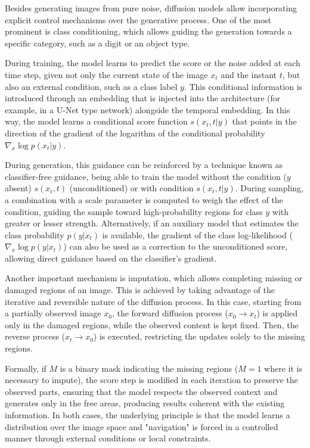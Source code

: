 \documentclass[11pt,a4paper]{article}
\begin{document}
Besides generating images from pure noise, diffusion models allow incorporating explicit control mechanisms over the generative process. One of the most prominent is class conditioning, which allows guiding the generation towards a specific category, such as a digit or an object type.

During training, the model learns to predict the score or the noise added at each time step, given not only the current state of the image $x_t$ and the instant $t$, but also an external condition, such as a class label $y$. This conditional information is introduced through an embedding that is injected into the architecture (for example, in a U-Net type network) alongside the temporal embedding. In this way, the model learns a conditional score function $s(x_t, t | y)$ that points in the direction of the gradient of the logarithm of the conditional probability $\nabla_{x} \log p(x_t | y)$.

During generation, this guidance can be reinforced by a technique known as classifier-free guidance, being able to train the model without the condition ($y$ absent) $s(x_t, t)$ (unconditioned) or with condition $s(x_t, t | y)$. During sampling, a combination with a scale parameter is computed to weigh the effect of the condition, guiding the sample toward high-probability regions for class $y$ with greater or lesser strength. Alternatively, if an auxiliary model that estimates the class probability $p(y | x_t)$ is available, the gradient of the class log-likelihood ($\nabla_{x} \log p(y | x_t)$) can also be used as a correction to the unconditioned score, allowing direct guidance based on the classifier's gradient.

Another important mechanism is imputation, which allows completing missing or damaged regions of an image. This is achieved by taking advantage of the iterative and reversible nature of the diffusion process. In this case, starting from a partially observed image $x_0$, the forward diffusion process ($x_0 \to x_t$) is applied only in the damaged regions, while the observed content is kept fixed. Then, the reverse process ($x_t \to x_0$) is executed, restricting the updates solely to the missing regions.

Formally, if $M$ is a binary mask indicating the missing regions ($M=1$ where it is necessary to impute), the score step is modified in each iteration to preserve the observed parts, ensuring that the model respects the observed context and generates only in the free areas, producing results coherent with the existing information. In both cases, the underlying principle is that the model learns a distribution over the image space and "navigation" is forced in a controlled manner through external conditions or local constraints.
\end{document}
